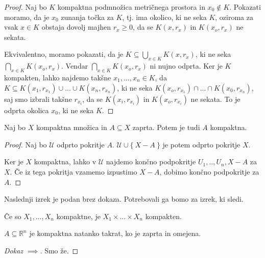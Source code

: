 \documentclass[11pt, a4paper]{article}
\begin{document}
    \begin{proof}
        Naj bo \(K\) kompaktna podmnožica metričnega prostora in \(x_0 \notin K\). Pokazati moramo, da je \(x_0\) zunanja točka za \(K\), tj. ima okolico, ki ne seka \(K\), oziroma za vsak \(x \in K\) obstaja dovolj majhen \(r_x \ge 0\), da se \(K(x,r_x)\) in \(K(x_o,r_x)\) ne sekata.
        \par
        Ekvivalentno, moramo pokazati, da je \(\displaystyle K \subseteq \bigcup_{x \in K} K(x,r_x)\), ki ne seka \(\displaystyle \bigcap_{x \in K} K(x_o,r_x)\). Vendar \(\displaystyle \bigcap_{x \in K} K(x_o,r_x)\) ni nujno odprta. Ker je \(K\) kompakten, lahko najdemo takšne \(x_1,...,x_n \in K\), da \(K \subseteq K(x_1,r_{x_1}) \cup ... \cup K(x_n,r_{x_n})\), ki ne seka \(K(x_o,r_{x_1}) \cap ... \cap K(x_0,r_{x_n})\), saj smo izbrali takšne \(r_{x_i}\), da se \(K(x_i,r_{x_i})\) in \(K(x_o,r_{x_i})\) ne sekata. To je odprta okolica \(x_0\), ki ne seka \(K\).
    \end{proof}

    \begin{theorem}
        Naj bo \(X\) kompaktna množica in \(A \subseteq X\) zaprta. Potem je tudi \(A\) kompaktna. 
    \end{theorem}

    \begin{proof}
        Naj bo \(\mathscr{U}\) odprto pokritje \(A\). \(\mathscr{U} \cup \{\ X - A\ \}\) je potem odprto pokritje \(X\).
        \par
        Ker je \(X\) kompaktna, lahko v \(\mathscr{U}\) najdemo končno podpokritje \(U_1,..,U_n,X-A\) za \(X\). Če iz tega pokritja vzamemo izpustimo \(X-A\), dobimo končno podpokritje za \(A\).
    \end{proof}

    Naslednji izrek je podan brez dokaza. Potrebovali ga bomo za izrek, ki sledi. 
    \begin{theorem}
        Če so \(X_1,...,X_n\) kompaktne, je \(X_1 \times ... \times X_n\) kompakten.
    \end{theorem}

    \begin{theorem}
        \(A \subseteq \mathbb{R}^n\) je kompaktna natanko takrat, ko je zaprta in omejena.
    \end{theorem}

    \begin{proof}[Dokaz \(\implies\)]
        Smo že.
    \end{proof}
\end{document}
